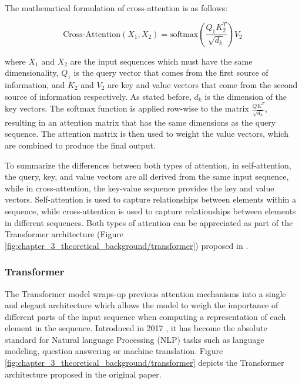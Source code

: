 The mathematical formulation of cross-attention is as follows:

\begin{equation}
	\text{Cross-Attention}(X_{1}, X_{2}) = \text{softmax}\left(\frac{Q_{1}K_{2}^T}{\sqrt{d_k}}\right)V_{2}
\end{equation}

where $X_{1}$ and $X_{2}$ are the input sequences which must have the same dimensionality, $Q_{1}$ is the query vector that comes from the first source of information, and $K_{2}$ and $V_{2}$ are key and value vectors that come from the second source of information respectively. As stated before, $d_k$ is the dimension of the key vectors. The softmax function is applied row-wise to the matrix $\frac{QK^T}{\sqrt{d_k}}$, resulting in an attention matrix that has the same dimensions as the query sequence. The attention matrix is then used to weight the value vectors, which are combined to produce the final output.

To summarize the differences between both types of attention, in self-attention, the query, key, and value vectors are all derived from the same input sequence, while in cross-attention, the key-value sequence provides the key and value vectors. Self-attention is used to capture relationships between elements within a sequence, while cross-attention is used to capture relationships between elements in different sequences. Both types of attention can be appreciated as part of the Transformer architecture (Figure \ref{fig:chapter_3_theoretical_background/transformer}) proposed in \cite{vaswani2017attention}.

\subsubsection{Transformer}
\label{subsubsec:3_transformer}


The Transformer model wraps-up previous attention mechanisms into a single and elegant architecture which allows the model to weigh the importance of different parts of the input sequence when computing a representation of each element in the sequence. Introduced in 2017 \cite{vaswani2017attention}, it has become the absolute standard for Natural language Processing (NLP) tasks such as language modeling, question answering or machine translation. Figure \ref{fig:chapter_3_theoretical_background/transformer} depicts the Transformer architecture proposed in the original paper.

